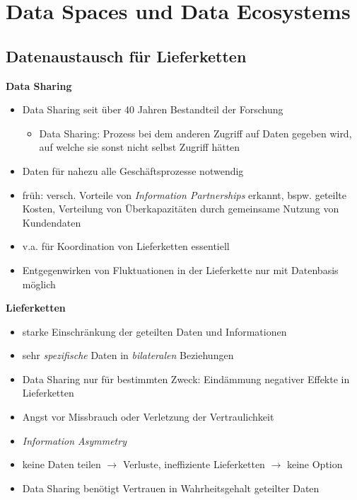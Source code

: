 
\section{Data Spaces und Data Ecosystems}

\subsection{Datenaustausch für Lieferketten}

\textbf{Data Sharing}
\begin{itemize}
    \item Data Sharing seit über 40 Jahren Bestandteil der Forschung
    \begin{itemize}
        \item Data Sharing: Prozess bei dem anderen Zugriff auf Daten gegeben wird, auf welche sie sonst nicht selbst Zugriff hätten
    \end{itemize}
    \item Daten für nahezu alle Geschäftsprozesse notwendig
    \item früh: versch. Vorteile von \emph{Information Partnerships} erkannt, bspw. geteilte Kosten, Verteilung von Überkapazitäten durch gemeinsame Nutzung von Kundendaten
    \item v.a. für Koordination von Lieferketten essentiell
    \item Entgegenwirken von Fluktuationen in der Lieferkette nur mit Datenbasis möglich~\cite{mollerIndustrialDataEcosystems2024}
\end{itemize}

\vspace{1em}

\textbf{Lieferketten}
\begin{itemize}
    \item starke Einschränkung der geteilten Daten und Informationen
    \item sehr \emph{spezifische} Daten in \emph{bilateralen} Beziehungen
    \item Data Sharing nur für bestimmten Zweck: Eindämmung negativer Effekte in Lieferketten
    \item Angst vor Missbrauch oder Verletzung der Vertraulichkeit
    \item \emph{Information Asymmetry}
    \item keine Daten teilen $\to$ Verluste, ineffiziente Lieferketten $\to$ keine Option
    \item Data Sharing benötigt Vertrauen in Wahrheitsgehalt geteilter Daten~\cite{mollerIndustrialDataEcosystems2024}
\end{itemize}


